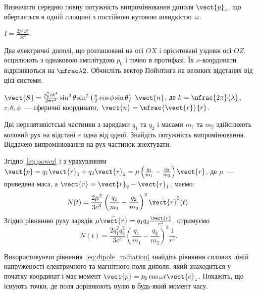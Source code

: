 \begin{problem}
Визначити середню повну потужність випромінювання диполя $\vect{p}_e$, що обертається в одній площині з постійною кутовою швидкістю~$\omega$.
\begin{solution}
	$I = \frac{2p^2\omega^4}{3c^3}$.
\end{solution}
\end{problem}

\begin{problem}
Два електричні диполі, що розташовані на осі $OX$ і орієнтовані уздовж осі $OZ$, осцилюють з однаковою амплітудою $p_0$ і точно в протифазі. Їх $x$-координати відрізняються на $\nfrac\lambda2$. Обчисліть вектор Пойнтінга на великих відстанях від цієї системи.
\begin{solution}
	$\vect{S} = \frac{p_0^2ck^4}{2\pi r^2}\sin^2\theta\sin^2\left(\frac\pi2\cos\phi\sin\theta\right)\ \vect{n}$, де $k=\nfrac{2\pi}{\lambda}$, $r,\theta,\phi$~--- сферичні координати, $\vect{n} = \nfrac{\vect{r}}{r}$.
\end{solution}
\end{problem}

\begin{problem}%
Дві нерелятивістські частинки з зарядами $q_1$ та $q_2$ і масами $m_1$ та $m_2$ здійснюють коловий рух на відстані $r$ одна від одної. Знайдіть потужність випромінювання. Віддачею випромінювання на рух частинок знехтувати.
\begin{solution}
	Згідно~\eqref{eq:power} і з урахуванням $\vect{p} = q_1\vect{r}_1 + q_2\vect{r}_2 = \mu\left( \frac{q_1}{m_1}  - \frac{q_2}{m_2}\right)\vect{r} $, де $\mu$~--- приведена маса, а $\vect{r} = \vect{r}_2 - \vect{r}_1$, маємо:
	\[
		N(t) = \frac{2\mu^2}{3c^3}\left( \frac{q_1}{m_1}  - \frac{q_2}{m_2}\right)^2\ddot{\vect{r}}^2(t).
	\]
	Згідно рівнянню руху зарядів $\mu\ddot{\vect{r}} = {q_1q_2}\frac{\vect{r}}{r^3}$, отримуємо
	\[
		N(t) = \frac{2q_1^2q_2^2}{3c^3} \left( \frac{q_1}{m_1} - \frac{q_2}{m_2}\right)^2 \frac{1}{r^4}.
	\]
\end{solution}
\end{problem}

\begin{problem}
Використовуючи рівняння~\eqref{eq:dipole_radiation} знайдіть рівняння силових ліній напруженості електричного та магнітного поля диполя, який знаходиться у початку координат і має момент $\vect{p} = p_0\cos\omega t \vect{e}_z$. Покажіть, що існують точки, де поля дорівнюють нулю в будь-який момент часу.
\end{problem}


